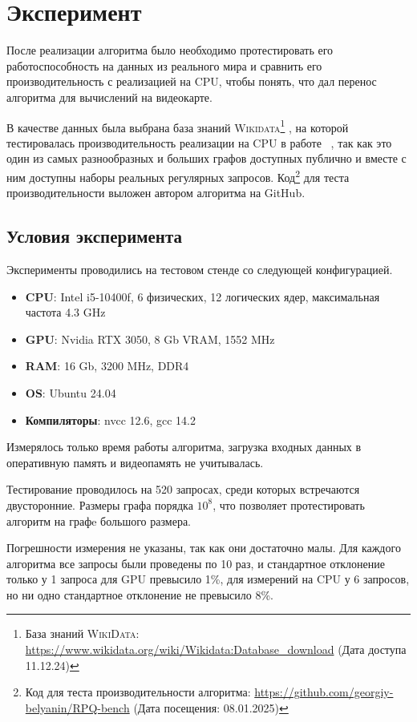 
\section{Эксперимент}

После реализации алгоритма было необходимо протестировать его работоспособность на данных из реального мира и сравнить его производительность с реализацией на CPU, чтобы понять, что дал перенос алгоритма для вычислений на видеокарте.

В качестве данных была выбрана база знаний \textsc{Wikidata}\footnote{База знаний \textsc{WikiData}: \href{https://www.wikidata.org/wiki/Wikidata:Database_download}{https://www.wikidata.org/wiki/Wikidata:Database\_download} (Дата доступа 11.12.24)} \cite{wikidata}, на которой тестировалась производительность реализации на CPU в работе ~\cite{OldRpqVkr}, так как это один из самых разнообразных и больших графов доступных публично и вместе с ним доступны наборы реальных регулярных запросов. Код\footnote{Код для теста производительности алгоритма: \url{https://github.com/georgiy-belyanin/RPQ-bench} (Дата посещения: 08.01.2025)} для теста производительности выложен автором алгоритма на GitHub.

\subsection{Условия эксперимента}
Эксперименты проводились на тестовом стенде со следующей конфигурацией.
\begin{itemize}
    \item \textbf{CPU}: Intel i5-10400f, 6 физических, 12 логических ядер, максимальная частота 4.3 GHz
    \item \textbf{GPU}: Nvidia RTX 3050, 8 Gb VRAM, 1552 MHz
    \item \textbf{RAM}: 16 Gb, 3200 MHz, DDR4
    \item \textbf{OS}: Ubuntu 24.04
    \item \textbf{Компиляторы}: nvcc 12.6, gcc 14.2
\end{itemize}
Измерялось только время работы алгоритма, загрузка входных данных в оперативную память и видеопамять не учитывалась.

Тестирование проводилось на 520 запросах, среди которых встречаются двусторонние. Размеры графа порядка $10^8$, что позволяет протестировать алгоритм на графe большого размера.

Погрешности измерения не указаны, так как они достаточно малы.
Для каждого алгоритма все запросы были проведены по 10 раз, и стандартное отклонение только у 1 запроса для GPU превысило 1\%, для измерений на CPU у 6 запросов, но ни одно стандартное отклонение не превысило 8\%.

